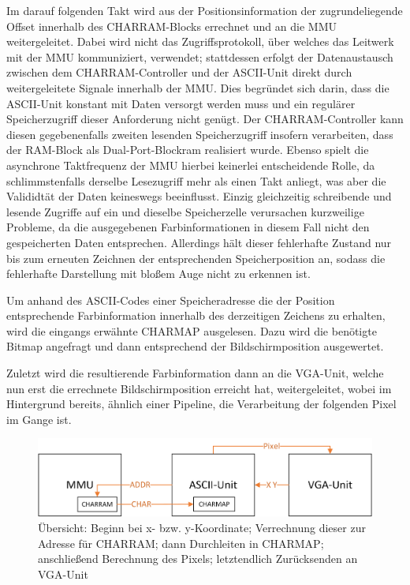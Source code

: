 Im darauf folgenden Takt wird aus der Positionsinformation der zugrundeliegende Offset innerhalb des CHARRAM-Blocks errechnet und an die MMU weitergeleitet. Dabei wird nicht das Zugriffsprotokoll, \"uber welches das Leitwerk mit der MMU kommuniziert, verwendet; stattdessen erfolgt der Datenaustausch zwischen dem CHARRAM-Controller und der ASCII-Unit direkt durch weitergeleitete Signale innerhalb der MMU. Dies begr\"undet sich darin, dass die ASCII-Unit konstant mit Daten versorgt werden muss und ein regul\"arer Speicherzugriff dieser Anforderung nicht gen\"ugt. Der CHARRAM-Controller kann diesen gegebenenfalls zweiten lesenden Speicherzugriff insofern verarbeiten, dass der RAM-Block als Dual-Port-Blockram realisiert wurde. Ebenso spielt die asynchrone Taktfrequenz der MMU hierbei keinerlei entscheidende Rolle, da schlimmstenfalls derselbe Lesezugriff mehr als einen Takt anliegt, was aber die Valididt\"at der Daten keineswegs beeinflusst. Einzig gleichzeitig schreibende und lesende Zugriffe auf ein und dieselbe Speicherzelle verursachen kurzweilige Probleme, da die ausgegebenen Farbinformationen in diesem Fall nicht den gespeicherten Daten entsprechen. Allerdings h\"alt dieser fehlerhafte Zustand nur bis zum erneuten Zeichnen der entsprechenden Speicherposition an, sodass die fehlerhafte Darstellung mit blo\ss{}em Auge nicht zu erkennen ist.

Um anhand des ASCII-Codes einer Speicheradresse die der Position entsprechende Farbinformation innerhalb des derzeitigen Zeichens zu erhalten, wird die eingangs erw\"ahnte CHARMAP ausgelesen. Dazu wird die ben\"otigte Bitmap angefragt und dann entsprechend der Bildschirmposition ausgewertet. 

Zuletzt wird die resultierende Farbinformation dann an die VGA-Unit, welche nun erst die errechnete Bildschirmposition erreicht hat, weitergeleitet, wobei im Hintergrund bereits, \"ahnlich einer Pipeline, die Verarbeitung der folgenden Pixel im Gange ist.

\begin{figure}[H]
	\centering
	\label{fig:overview}
		\includegraphics[width=1.0\textwidth]{ASCII.png}
	\caption[\"Ubersicht \"uber die ASCII-Unit]{\"Ubersicht: Beginn bei x- bzw. y-Koordinate; Verrechnung dieser zur Adresse f\"ur CHARRAM; dann Durchleiten in CHARMAP; anschlie\ss{}end Berechnung des Pixels; letztendlich Zur\"ucksenden an VGA-Unit}
\end{figure}

\newpage


